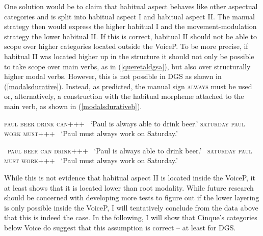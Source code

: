 One solution would be to claim that habitual aspect behaves like other aspectual categories and is split into habitual aspect I and habitual aspect II. The manual strategy then would express the higher habitual I and the movement-modulation strategy the lower habitual II. If this is correct, habitual II should not be able to scope over higher categories located outside the VoiceP. To be more precise, if habitual II was located higher up in the structure it should not only be possible to take scope over main verbs, as in (\ref{queretaldgsa}), but also over structurally higher modal verbs. However, this is not possible in DGS as shown in (\ref{modalsdurative}). Instead, as predicted, the manual sign \textsc{always} must be used or, alternatively, a construction with the habitual morpheme  attached to the main verb, as shown in (\ref{modalsdurativeb}).

\begin{exe}
\ex\label{modalsdurative}\begin{xlist}
\ex *\textsc{paul beer drink can+++}
\glt \textcolor{white}{*}`Paul is always able to drink beer.'
\ex *\textsc{saturday paul work must+++}
\glt \textcolor{white}{*}`Paul must always work on Saturday.'
\end{xlist}
\end{exe}

\begin{exe}
\ex\label{modalsdurativeb}\begin{xlist}
\ex \textcolor{white}{*}\textsc{paul beer can drink+++}
\glt \textcolor{white}{*}`Paul is always able to drink beer.'
\ex \textcolor{white}{*}\textsc{saturday paul must work+++}
\glt \textcolor{white}{*}`Paul must always work on Saturday.'
\end{xlist}
\end{exe}

\noindent While this is not evidence that habitual aspect II is located inside the VoiceP, it at least shows that it is located lower than root modality. While future research should be concerned with developing more tests to figure out if the lower layering is only possible inside the VoiceP, I will tentatively conclude from the data above that this is indeed the case. In the following, I will show that Cinque's categories below Voice do suggest that this assumption is correct -- at least for DGS.


